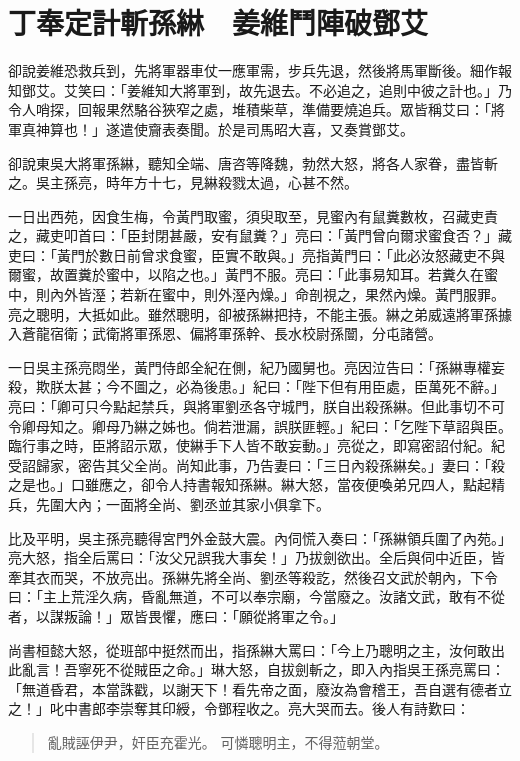 
\chapter{丁奉定計斬孫綝　姜維鬥陣破鄧艾}

卻說姜維恐救兵到，先將軍器車仗一應軍需，步兵先退，然後將馬軍斷後。細作報知鄧艾。艾笑曰：「姜維知大將軍到，故先退去。不必追之，追則中彼之計也。」乃令人哨探，回報果然駱谷狹窄之處，堆積柴草，準備要燒追兵。眾皆稱艾曰：「將軍真神算也！」遂遣使齎表奏聞。於是司馬昭大喜，又奏賞鄧艾。

卻說東吳大將軍孫綝，聽知全端、唐咨等降魏，勃然大怒，將各人家眷，盡皆斬之。吳主孫亮，時年方十七，見綝殺戮太過，心甚不然。

一日出西苑，因食生梅，令黃門取蜜，須臾取至，見蜜內有鼠糞數枚，召藏吏責之，藏吏叩首曰：「臣封閉甚嚴，安有鼠糞？」亮曰：「黃門曾向爾求蜜食否？」藏吏曰：「黃門於數日前曾求食蜜，臣實不敢與。」亮指黃門曰：「此必汝怒藏吏不與爾蜜，故置糞於蜜中，以陷之也。」黃門不服。亮曰：「此事易知耳。若糞久在蜜中，則內外皆溼；若新在蜜中，則外溼內燥。」命剖視之，果然內燥。黃門服罪。亮之聰明，大抵如此。雖然聰明，卻被孫綝把持，不能主張。綝之弟威遠將軍孫據入蒼龍宿衛；武衛將軍孫恩、偏將軍孫幹、長水校尉孫闓，分屯諸營。

一日吳主孫亮悶坐，黃門侍郎全紀在側，紀乃國舅也。亮因泣告曰：「孫綝專權妄殺，欺朕太甚；今不圖之，必為後患。」紀曰：「陛下但有用臣處，臣萬死不辭。」亮曰：「卿可只今點起禁兵，與將軍劉丞各守城門，朕自出殺孫綝。但此事切不可令卿母知之。卿母乃綝之姊也。倘若泄漏，誤朕匪輕。」紀曰：「乞陛下草詔與臣。臨行事之時，臣將詔示眾，使綝手下人皆不敢妄動。」亮從之，即寫密詔付紀。紀受詔歸家，密告其父全尚。尚知此事，乃告妻曰：「三日內殺孫綝矣。」妻曰：「殺之是也。」口雖應之，卻令人持書報知孫綝。綝大怒，當夜便喚弟兄四人，點起精兵，先圍大內；一面將全尚、劉丞並其家小俱拿下。

比及平明，吳主孫亮聽得宮門外金鼓大震。內伺慌入奏曰：「孫綝領兵圍了內苑。」亮大怒，指全后罵曰：「汝父兄誤我大事矣！」乃拔劍欲出。全后與伺中近臣，皆牽其衣而哭，不放亮出。孫綝先將全尚、劉丞等殺訖，然後召文武於朝內，下令曰：「主上荒淫久病，昏亂無道，不可以奉宗廟，今當廢之。汝諸文武，敢有不從者，以謀叛論！」眾皆畏懼，應曰：「願從將軍之令。」

尚書桓懿大怒，從班部中挺然而出，指孫綝大罵曰：「今上乃聰明之主，汝何敢出此亂言！吾寧死不從賊臣之命。」琳大怒，自拔劍斬之，即入內指吳王孫亮罵曰：「無道昏君，本當誅戳，以謝天下！看先帝之面，廢汝為會稽王，吾自選有德者立之！」叱中書郎李崇奪其印綬，令鄧程收之。亮大哭而去。後人有詩歎曰：

\begin{quote}
亂賊誣伊尹，奸臣充霍光。
可憐聰明主，不得蒞朝堂。
\end{quote}

